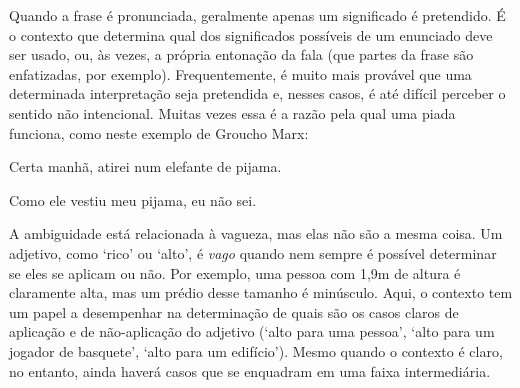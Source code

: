 Quando a frase é pronunciada, geralmente apenas um significado é pretendido. É o contexto que determina qual dos significados possíveis de um enunciado deve ser usado, ou, às vezes, a própria entonação da fala (que partes da frase são enfatizadas, por exemplo). Frequentemente, é muito mais provável que uma determinada interpretação seja pretendida e, nesses casos, é até difícil perceber o sentido não intencional. Muitas vezes essa é a razão pela qual uma piada funciona, como neste exemplo de Groucho Marx:
\begin{earg}
\item[] Certa manhã, atirei num elefante de pijama.
\item[] Como ele vestiu meu pijama, eu não sei.
\end{earg} 

A ambiguidade está relacionada à vagueza, mas elas não são a mesma coisa. Um adjetivo, como `rico' ou `alto', é \textit{vago} quando nem sempre é possível determinar se eles se aplicam ou não. Por exemplo, uma pessoa com 1,9m de altura é claramente alta, mas um prédio desse tamanho é minúsculo. Aqui, o contexto tem um papel a desempenhar na determinação de quais são os casos claros de aplicação e de não-aplicação do adjetivo (`alto para uma pessoa', `alto para um jogador de basquete', `alto para um edifício'). Mesmo quando o contexto é claro, no entanto, ainda haverá casos que se enquadram em uma faixa intermediária.

